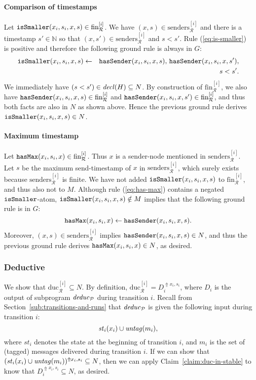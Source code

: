 \documentclass{tlp}
\newcommand{\Nat}{\mathbb{N}}  \newcommand{\len}[1]{|#1|} \newcommand{\rom}[1]{\text{\emph{(#1)}}} \newcommand{\romI}{\rom i}
\newcommand{\ded}{\mathcal{P}}
\newcommand{\addlt}[3]{#1^{\Uparrow#2,#3}}
\newcommand{\issmaller}{\pred{isSmaller}}
\newcommand{\hasmax}{\pred{hasMax}}
\newcommand{\hassender}{\pred{hasSender}}
\newcommand{\decl}[1]{\fname{decl}(#1)}
\newcommand{\cnfs}{\mathit{st}}
\newcommand{\run}{\mathcal{R}}
\newcommand{\untag}[1]{\fname{untag}(#1)}
\newcommand{\deduc}[1]{\fname{deduc}_{#1}}
\newcommand{\slicefin}[1]{\text{fin}_{\run}^{[#1]}}
\newcommand{\sliceduc}[1]{\text{duc}_{\run}^{[#1]}}
\newcommand{\senders}[1]{\text{senders}_{\run}^{[#1]}}
\newcommand{\grded}{G}
\begin{document}
\begin{appendix}
\paragraph*{Comparison of timestamps}

Let $\issmaller(x_{i},s_{i},x,s)\in\slicefin i$. We have $(x,s)\in\senders i$
and there is a timestamp $s'\in\Nat$ so that $(x,s')\in\senders i$
and $s<s'$. Rule (\ref{eq:is-smaller}) is positive and therefore
the following ground rule is always in $\grded$:
\begin{eqnarray*}
\issmaller(x_{i},s_{i},x,s) & \gets & \hassender(x_{i},s_{i},x,s),\,\hassender(x_{i},s_{i},x,s'),\\
 &  & s<s'.
\end{eqnarray*}
We immediately have $(s<s')\in\decl H\subseteq N$. By construction
of $\slicefin i$, we also have $\hassender(x_{i},s_{i},x,s)\in\slicefin i$
and $\hassender(x_{i},s_{i},x,s')\in\slicefin i$, and thus both facts
are also in $N$ as shown above. Hence the previous ground rule derives
$\issmaller(x_{i},s_{i},x,s)\in N$.




\paragraph*{Maximum timestamp}

Let $\hasmax(x_{i},s_{i},x)\in\slicefin i$. Thus $x$ is a sender-node
mentioned in $\senders i$. Let $s$ be the maximum send-timestamp
of $x$ in $\senders i$, which surely exists because $\senders i$
is finite. We have not added $\issmaller(x_{i},s_{i},x,s)$ to $\slicefin i$,
and thus also not to $M$. Although rule (\ref{eq:has-max}) contains
a negated $\issmaller$-atom, $\issmaller(x_{i},s_{i},x,s)\notin M$
implies that the following ground rule is in $\grded$:
\[
\hasmax(x_{i},s_{i},x)\gets\hassender(x_{i},s_{i},x,s).
\]
Moreover, $(x,s)\in\senders i$ implies $\hassender(x_{i},s_{i},x,s)\in N$,
and thus the previous ground rule derives $\hasmax(x_{i},s_{i},x)\in N$,
as desired.


\subsubsection{Deductive}

We show that $\sliceduc i\subseteq N$. By definition, $\sliceduc i=\addlt{D_{i}}{x_{i}}{s_{i}}$,
where $D_{i}$ is the output of subprogram $\deduc{\ded}$ during
transition $i$. Recall from Section~\ref{sub:transitions-and-runs}
that $\deduc{\ded}$ is given the following input during transition
$i$:
\[
\cnfs_{i}(x_{i})\cup\untag{m_{i}},
\]
where $\cnfs_{i}$ denotes the state at the beginning of transition
$i$, and $m_{i}$ is the set of (tagged) messages delivered during
transition $i$. If we can show that $\addlt{(\cnfs_{i}(x_{i})\cup\untag{m_{i}})}{x_{i}}{s_{i}}\subseteq N$,
then we can apply Claim~\ref{claim:duc-in-stable} to know that $\addlt{D_{i}}{x_{i}}{s_{i}}\subseteq N$,
as desired. 



\end{appendix}
\end{document}
